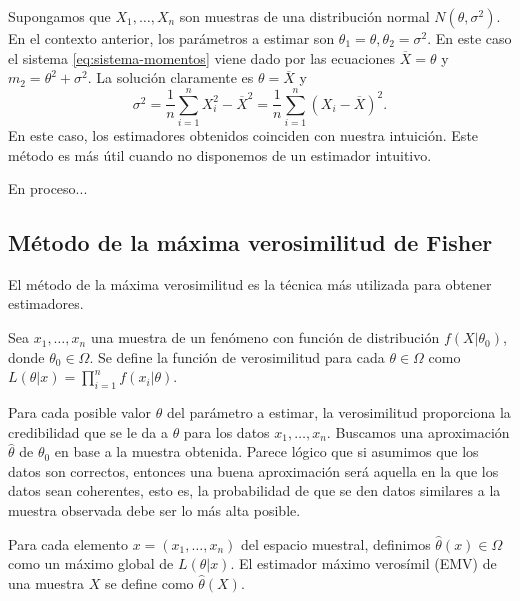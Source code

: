 \documentclass{article}
\begin{document}
\begin{ex}
    Supongamos que $X_1, \ldots, X_n$ son muestras de una distribución normal $N(\theta, \sigma^2)$. En el contexto anterior, los parámetros a estimar son $\theta_1 = \theta, \theta_2 = \sigma^2$. En este caso el sistema \eqref{eq:sistema-momentos} viene dado por las ecuaciones $\overline{X} = \theta$ y $m_2 = \theta^2 + \sigma^2$. La solución claramente es $\theta = \overline{X}$ y
    \[\sigma^2 = \frac{1}{n} \sum_{i = 1}^n X_i^2 - \overline{X}^2 = \frac{1}{n} \sum_{i = 1}^n (X_i - \overline{X})^2.\]
    En este caso, los estimadores obtenidos coinciden con nuestra intuición. Este método es más útil cuando no disponemos de un estimador intuitivo.
\end{ex}

\begin{ex}
    En proceso...
\end{ex}

\subsection{Método de la máxima verosimilitud de Fisher}

    El método de la máxima verosimilitud es la técnica más utilizada para obtener estimadores.

    \begin{definition}
        Sea $x_1, \ldots, x_n$ una muestra de un fenómeno con función de distribución $f(X | \theta_0)$, donde $\theta_0 \in \Omega$. Se define la función de verosimilitud para cada $\theta \in \Omega$ como $L(\theta | x) = \prod_{i = 1}^n f(x_i| \theta)$.
    \end{definition}

    Para cada posible valor $\theta$ del parámetro a estimar, la verosimilitud proporciona la credibilidad que se le da a $\theta$ para los datos $x_1, \ldots, x_n$. Buscamos una aproximación $\hat{\theta}$ de $\theta_0$ en base a la muestra obtenida. Parece lógico que si asumimos que los datos son correctos, entonces una buena aproximación será aquella en la que los datos sean coherentes, esto es, la probabilidad de que se den datos similares a la muestra observada debe ser lo más alta posible.

    \begin{definition}
        Para cada elemento $x = (x_1, \ldots, x_n)$ del espacio muestral, definimos $\hat{\theta}(x) \in \Omega$ como un máximo global de $L(\theta | x)$. El estimador máximo verosímil (EMV) de una muestra $X$ se define como $\hat{\theta}(X)$.
    \end{definition}
\end{document}
